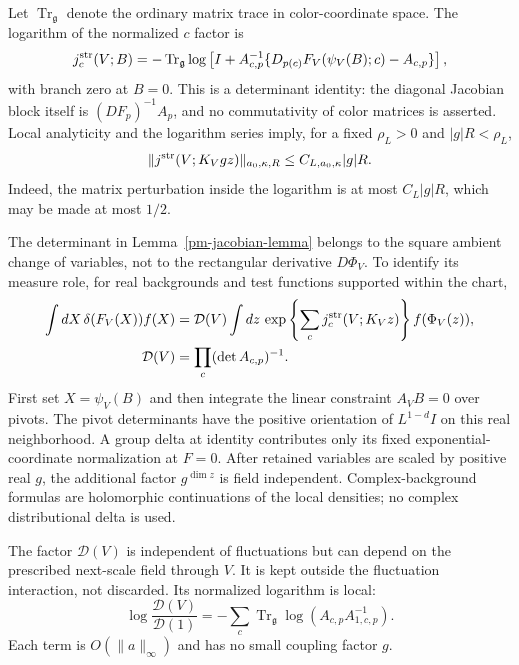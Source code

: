 \documentclass[11pt]{article}
\begin{document}
Let $\operatorname{Tr}_{\mathfrak g}$ denote the ordinary
matrix trace in color-coordinate space. The logarithm of the
normalized $c$ factor is
\begin{equation}\label{pm-jacobian-log}
 j_c^{\rm str}(V;B)=
 -\operatorname{Tr}_{\mathfrak g}\log\left[
 I+A_{c,p}^{-1}
 \{D_{p(c)}F_V(\psi_V(B);c)-A_{c,p}\}\right],
\end{equation}
with branch zero at $B=0$. This is a determinant identity:
the diagonal Jacobian block itself is $(DF_p)^{-1}A_p$,
and no commutativity of color matrices is asserted.
Local analyticity and the logarithm series imply, for a fixed
$\rho_L>0$ and $|g|R<\rho_L$,
\begin{equation}\label{pm-jacobian-bound}
 \|j^{\rm str}(V;K_Vgz)\|_{a_0,\kappa,R}
 \le C_{L,a_0,\kappa}|g|R.
\end{equation}
Indeed, the matrix perturbation inside the logarithm is at
most $C_L|g|R$, which may be made at most $1/2$.

The determinant in Lemma~\ref{pm-jacobian-lemma} belongs to
the square ambient change of variables, not to the rectangular
derivative $D\Phi_V$. To identify its measure role, for real
backgrounds and test functions supported within the chart,
\begin{equation}\label{pm-delta-reduction}
 \begin{split}
 \int dX\,\delta(F_V(X))f(X)
 &=\mathcal D(V)\int dz\,
 \exp\left\{\sum_cj_c^{\rm str}(V;K_Vz)\right\}
 f(\Phi_V(z)),\\
 \mathcal D(V)&=\prod_c(\det A_{c,p})^{-1}.
 \end{split}
\end{equation}
First set $X=\psi_V(B)$ and then integrate the linear
constraint $A_VB=0$ over pivots. The pivot determinants have
the positive orientation of $L^{1-d}I$ on this real
neighborhood. A group delta at identity contributes only its
fixed exponential-coordinate normalization at $F=0$.
After retained variables are scaled by positive real $g$,
the additional factor $g^{\dim z}$ is field independent.
Complex-background formulas are holomorphic continuations
of the local densities; no complex distributional delta is used.

The factor $\mathcal D(V)$ is independent of fluctuations
but can depend on the prescribed next-scale field through $V$.
It is kept outside the fluctuation interaction, not discarded.
Its normalized logarithm is local:
\begin{equation}\label{pm-background-determinant}
 \log\frac{\mathcal D(V)}{\mathcal D(1)}
 =-\sum_c\operatorname{Tr}_{\mathfrak g}
       \log(A_{c,p}A_{1,c,p}^{-1}).
\end{equation}
Each term is $O(\|a\|_\infty)$ and has no small coupling
factor $g$.
\end{document}
